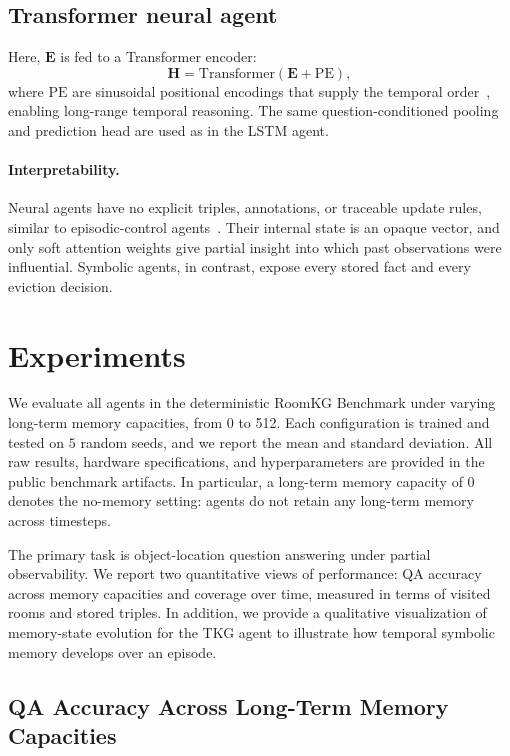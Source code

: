\documentclass[Afour,sageh,times]{sagej}
\begin{document}
\subsection*{Transformer neural agent}
Here, $\mathbf{E}$ is fed to a Transformer encoder:
\[
\mathbf{H} = \text{Transformer}(\mathbf{E} + \mathrm{PE}),
\]
where $\mathrm{PE}$ are sinusoidal positional encodings that supply the temporal
order~\citep{vaswani2023attentionneed}, enabling long-range temporal
reasoning. The same question-conditioned
pooling and prediction head are used as in the LSTM agent.

\paragraph{Interpretability.}
Neural agents have no explicit triples, annotations, or traceable update rules, similar
to episodic-control
agents~\citep{pritzel2017neuralepisodiccontrol,blundell2016modelfreeepisodiccontrol}.
Their internal state is an opaque vector, and only soft attention weights give partial
insight into which past observations were influential. Symbolic agents, in contrast,
expose every stored fact and every eviction decision.


\section{Experiments}

We evaluate all agents in the deterministic RoomKG Benchmark under varying long-term
memory capacities, from 0 to 512. Each configuration is trained and tested on $5$ random
seeds, and we report the mean and standard deviation. All raw results, hardware
specifications, and hyperparameters are provided in the public benchmark artifacts. In
particular, a long-term memory capacity of $0$ denotes the no-memory setting: agents do
not retain any long-term memory across timesteps.

The primary task is object-location question answering under partial observability. We
report two quantitative views of performance: QA accuracy across memory capacities and
coverage over time, measured in terms of visited rooms and stored triples. In addition,
we provide a qualitative visualization of memory-state evolution for the TKG agent
to illustrate how temporal symbolic memory develops over an episode.

\subsection{QA Accuracy Across Long-Term Memory Capacities}
\end{document}
